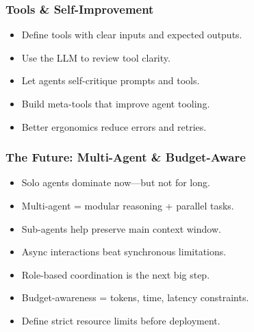 \begin{frame}[fragile]\frametitle{Tools \& Self-Improvement}
    \begin{itemize}
        \item Define tools with clear inputs and expected outputs.
        \item Use the LLM to review tool clarity.
        \item Let agents self-critique prompts and tools.
        \item Build meta-tools that improve agent tooling.
        \item Better ergonomics reduce errors and retries.
    \end{itemize}
\end{frame}

\begin{frame}[fragile]\frametitle{The Future: Multi-Agent \& Budget-Aware}
    \begin{itemize}
        \item Solo agents dominate now—but not for long.
        \item Multi-agent = modular reasoning + parallel tasks.
        \item Sub-agents help preserve main context window.
        \item Async interactions beat synchronous limitations.
        \item Role-based coordination is the next big step.
        \item Budget-awareness = tokens, time, latency constraints.
        \item Define strict resource limits before deployment.
    \end{itemize}
\end{frame}

